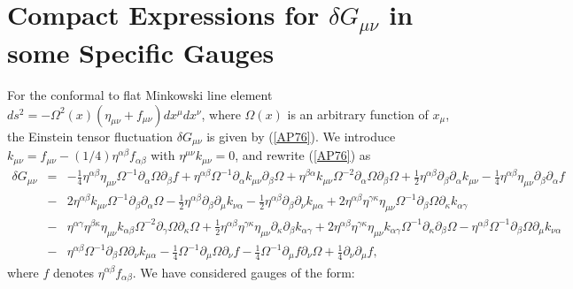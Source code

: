 \documentclass[aps]{revtex4}
\begin{document}
\section{Compact Expressions for $\delta G_{\mu\nu}$ in some Specific Gauges}
\label{SD}

For the conformal to flat Minkowski line element  $ds^2=- \Omega^2(x)(\eta_{\mu\nu}+f_{\mu\nu})dx^{\mu}dx^{\nu}$, where $\Omega(x)$ is an arbitrary function of $x_{\mu}$, the Einstein tensor fluctuation  $\delta G_{\mu\nu}$ is given by (\ref{AP76}). We introduce $k_{\mu\nu}=f_{\mu\nu}-(1/4)\eta^{\alpha\beta}f_{\alpha\beta}$ with $\eta^{\mu\nu}k_{\mu\nu}=0$, and rewrite (\ref{AP76}) as 
%
\begin{eqnarray}
\delta G_{\mu\nu}&=&- \tfrac{1}{4} \eta^{\alpha \beta} \eta_{\mu \nu} \Omega^{-1} \partial_{\alpha}\Omega \partial_{\beta}f + \eta^{\alpha \beta} \Omega^{-1} \partial_{\alpha}k_{\mu \nu} \partial_{\beta}\Omega + \eta^{\beta \alpha} k_{\mu \nu} \Omega^{-2} \partial_{\alpha}\Omega \partial_{\beta}\Omega + \tfrac{1}{2} \eta^{\alpha \beta} \partial_{\beta}\partial_{\alpha}k_{\mu \nu} -  \tfrac{1}{4} \eta^{\alpha \beta} \eta_{\mu \nu} \partial_{\beta}\partial_{\alpha}f 
\nonumber\\
&-& 2 \eta^{\alpha \beta} k_{\mu \nu} \Omega^{-1} \partial_{\beta}\partial_{\alpha}\Omega -  \tfrac{1}{2} \eta^{\alpha \beta} \partial_{\beta}\partial_{\mu}k_{\nu \alpha} -  \tfrac{1}{2} \eta^{\alpha \beta} \partial_{\beta}\partial_{\nu}k_{\mu \alpha} + 2 \eta^{\alpha \beta} \eta^{\gamma \kappa} \eta_{\mu \nu} \Omega^{-1} \partial_{\beta}\Omega \partial_{\kappa}k_{\alpha \gamma} 
\nonumber\\
&-&  \eta^{\alpha \gamma} \eta^{\beta \kappa} \eta_{\mu \nu} k_{\alpha \beta} \Omega^{-2} \partial_{\gamma}\Omega \partial_{\kappa}\Omega + \tfrac{1}{2} \eta^{\alpha \beta} \eta^{\gamma \kappa} \eta_{\mu \nu} \partial_{\kappa}\partial_{\beta}k_{\alpha \gamma} + 2 \eta^{\alpha \beta} \eta^{\gamma \kappa} \eta_{\mu \nu} k_{\alpha \gamma} \Omega^{-1} \partial_{\kappa}\partial_{\beta}\Omega -  \eta^{\alpha \beta} \Omega^{-1} \partial_{\beta}\Omega \partial_{\mu}k_{\nu \alpha} 
\nonumber\\
&-&  \eta^{\alpha \beta} \Omega^{-1} \partial_{\beta}\Omega \partial_{\nu}k_{\mu \alpha} -  \tfrac{1}{4} \Omega^{-1} \partial_{\mu}\Omega \partial_{\nu}f -  \tfrac{1}{4} \Omega^{-1} \partial_{\mu}f \partial_{\nu}\Omega + \tfrac{1}{4} \partial_{\nu}\partial_{\mu}f,
\label{D1}
\end{eqnarray}
%
where $f$ denotes $\eta^{\alpha\beta}f_{\alpha\beta}$. We have considered gauges of the form:
\end{document}
